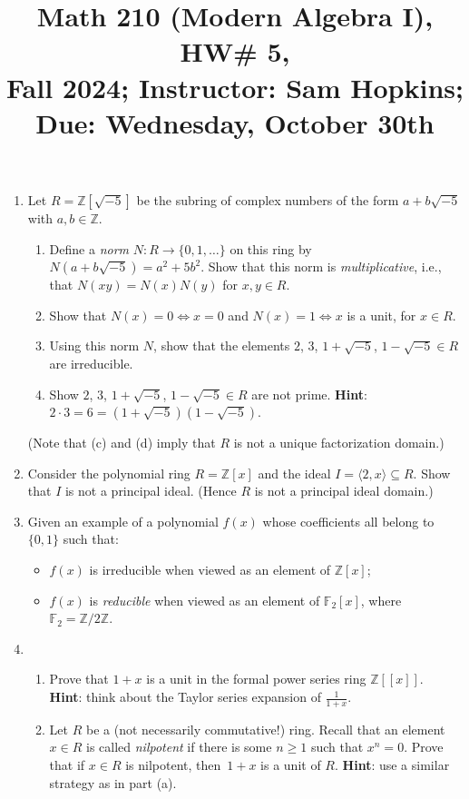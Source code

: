 \documentclass[11pt]{article}
\title{Math 210 (Modern Algebra I), HW\# 5, \\ {\normalsize Fall 2024; Instructor: Sam Hopkins; Due: Wednesday, October 30th}}
\date{}
\begin{document}
\maketitle

\thispagestyle{empty}

\begin{enumerate}

\item Let $R=\mathbb{Z}[\sqrt{-5}]$ be the subring of complex numbers of the form $a+b\sqrt{-5}$ with $a,b\in \mathbb{Z}$.
\begin{enumerate}
\item Define a \emph{norm} $N\colon R \to \{0,1,\ldots\}$ on this ring by $N(a+b\sqrt{-5})=a^2+5b^2$. Show that this norm is \emph{multiplicative}, i.e., that $N(xy)=N(x)N(y)$ for $x,y\in R$.
\item Show that $N(x)=0 \Leftrightarrow x=0$ and $N(x)=1 \Leftrightarrow x$ is a unit, for $x \in R$.
\item Using this norm $N$, show that the elements $2$, $3$, $1+\sqrt{-5}$, $1-\sqrt{-5} \in R$ are irreducible.
\item Show $2$, $3$, $1+\sqrt{-5}$, $1-\sqrt{-5} \in R$ are not prime. {\bf Hint}: $2 \cdot 3 = 6 = (1+\sqrt{-5})(1-\sqrt{-5})$.
\end{enumerate}
(Note that (c) and (d) imply that $R$ is not a unique factorization domain.)

\item Consider the polynomial ring $R=\mathbb{Z}[x]$ and the ideal $I=\langle 2, x \rangle \subseteq R$. Show that $I$ is not a principal ideal. (Hence $R$ is not a principal ideal domain.)

\item Given an example of a polynomial $f(x)$ whose coefficients all belong to $\{0,1\}$ such that:
\begin{itemize}
\item $f(x)$ is irreducible when viewed as an element of $\mathbb{Z}[x]$;
\item $f(x)$ is \emph{reducible} when viewed as an element of $\mathbb{F}_2[x]$, where $\mathbb{F}_2=\mathbb{Z}/2\mathbb{Z}$.
\end{itemize}

\item \begin{enumerate}
\item Prove that $1+x$ is a unit in the formal power series ring $\mathbb{Z}[[x]]$. \\{\bf Hint}: think about the Taylor series expansion of $\frac{1}{1+x}$.
\item Let $R$ be a (not necessarily commutative!) ring. Recall that an element $x \in R$ is called \emph{nilpotent} if there is some $n\geq 1$ such that $x^n=0$. Prove that if $x \in R$ is nilpotent, then~$1+x$ is a unit of $R$. {\bf Hint}: use a similar strategy as in part (a).
\end{enumerate}


\end{enumerate}
\end{document}
